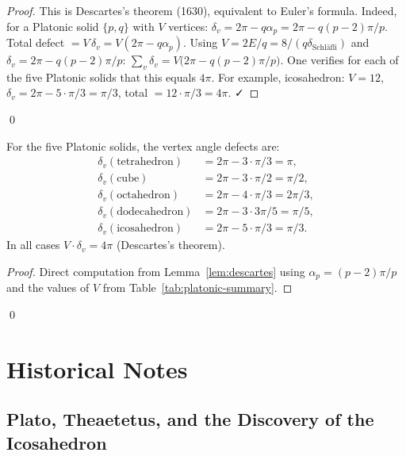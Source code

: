 \begin{proof}
This is Descartes's theorem (1630), equivalent to Euler's formula.  Indeed,
for a Platonic solid $\{p,q\}$ with $V$ vertices:
$\delta_v = 2\pi - q\alpha_p = 2\pi - q(p-2)\pi/p$.
Total defect $= V\,\delta_v = V(2\pi - q\alpha_p)$.
Using $V = 2E/q = 8/(q\delta_{\text{Schläfli}})$ and
$\delta_v = 2\pi - q(p-2)\pi/p$:
$\sum_v \delta_v = V\bigl(2\pi - q(p-2)\pi/p\bigr)$.
One verifies for each of the five Platonic solids that this equals $4\pi$.
For example, icosahedron: $V = 12$, $\delta_v = 2\pi - 5 \cdot \pi/3 = \pi/3$,
total $= 12 \cdot \pi/3 = 4\pi$. ✓
\end{proof}
\qed

\begin{corollary}
\label{cor:platonic-defect}
For the five Platonic solids, the vertex angle defects are:
\begin{align*}
  \delta_v(\text{tetrahedron}) &= 2\pi - 3 \cdot \pi/3 = \pi, \\
  \delta_v(\text{cube}) &= 2\pi - 3 \cdot \pi/2 = \pi/2, \\
  \delta_v(\text{octahedron}) &= 2\pi - 4 \cdot \pi/3 = 2\pi/3, \\
  \delta_v(\text{dodecahedron}) &= 2\pi - 3 \cdot 3\pi/5 = \pi/5, \\
  \delta_v(\text{icosahedron}) &= 2\pi - 5 \cdot \pi/3 = \pi/3.
\end{align*}
In all cases $V \cdot \delta_v = 4\pi$ (Descartes's theorem).
\end{corollary}

\begin{proof}
Direct computation from Lemma~\ref{lem:descartes} using $\alpha_p = (p-2)\pi/p$
and the values of $V$ from Table~\ref{tab:platonic-summary}.
\end{proof}
\qed


\section{Historical Notes}
\label{sec:historical-notes}

\subsection{Plato, Theaetetus, and the Discovery of the Icosahedron}
\label{subsec:history-plato}

